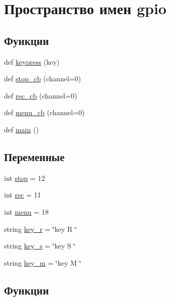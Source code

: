 \hypertarget{namespacegpio}{}\section{Пространство имен gpio}
\label{namespacegpio}
\subsection*{Функции}
\begin{DoxyCompactItemize}
\item 
def \hyperlink{namespacegpio_a163967890b998f0910bb0cefc45939ab}{keypress} (key)
\item 
def \hyperlink{namespacegpio_a3d6472f268230baafcc5895596b07a6a}{stop\+\_\+cb} (channel=0)
\item 
def \hyperlink{namespacegpio_a29bb86ae5be5d1d6f4f2e8783480a8cd}{rec\+\_\+cb} (channel=0)
\item 
def \hyperlink{namespacegpio_a67087cfb10312de7d9b64c388777585f}{menu\+\_\+cb} (channel=0)
\item 
def \hyperlink{namespacegpio_ae76663bf79b1124596595094a9a95e5a}{main} ()
\end{DoxyCompactItemize}
\subsection*{Переменные}
\begin{DoxyCompactItemize}
\item 
int \hyperlink{namespacegpio_a00bc49404c7d994457664d6352bb2779}{stop} = 12
\item 
int \hyperlink{namespacegpio_ac4b0388fe69e716c5162432e3cdb535e}{rec} = 11
\item 
int \hyperlink{namespacegpio_a6f3cdec53dcabbe77f454382ef596f33}{menu} = 18
\item 
string \hyperlink{namespacegpio_acdd7abc8e2ded2f119524bc5e42af82e}{key\+\_\+r} = \char`\"{}key R \char`\"{}
\item 
string \hyperlink{namespacegpio_aab8c27a0b381c11af8ed5c638d612456}{key\+\_\+s} = \char`\"{}key S \char`\"{}
\item 
string \hyperlink{namespacegpio_af7fb6ee836b3b623fee0a157b4084380}{key\+\_\+m} = \char`\"{}key M \char`\"{}
\end{DoxyCompactItemize}


\subsection{Функции}
\mbox{\label{namespacegpio_a163967890b998f0910bb0cefc45939ab}} 
